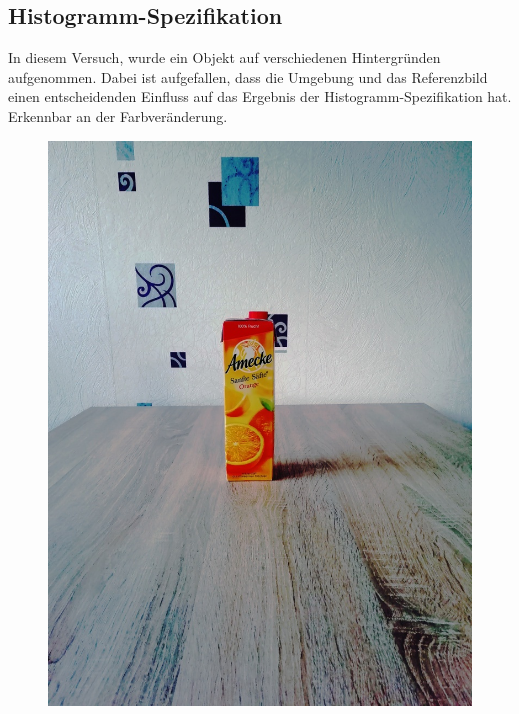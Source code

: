 \begin{appendices}
\section*{Histogramm-Spezifikation}
In diesem Versuch, wurde ein Objekt auf verschiedenen Hintergründen aufgenommen. Dabei ist aufgefallen, dass die Umgebung und das Referenzbild einen entscheidenden Einfluss auf das Ergebnis der Histogramm-Spezifikation hat. Erkennbar an der Farbveränderung.
\begin{figure}[htb]
\begin{minipage}[c]{0.2\textwidth}
\includegraphics[width=\textwidth]{Sources/Bild1_HS.jpg}
\end{minipage}
\hfill
\begin{minipage}[c]{0.08\textwidth}

\end{minipage}
\end{figure}
\end{appendices}

